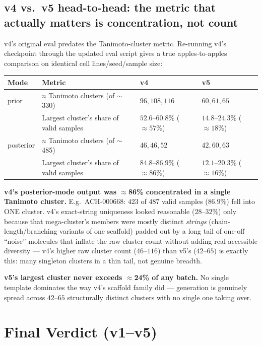 \documentclass[11pt]{article}
\begin{document}
\subsection{v4 vs.\ v5 head-to-head: the metric that actually matters is concentration, not count}
\label{sec:headtohead}

v4's original eval predates the Tanimoto-cluster metric. Re-running v4's checkpoint through the updated eval script gives a true apples-to-apples comparison on identical cell lines/seed/sample size:

\begin{center}
\begin{tabular}{@{}l l l l@{}}
\toprule
\textbf{Mode} & \textbf{Metric} & \textbf{v4} & \textbf{v5} \\
\midrule
prior & $n$ Tanimoto clusters (of $\sim$330) & $96, 108, 116$ & $60, 61, 65$ \\
      & Largest cluster's share of valid samples & $52.6$--$60.8\%$ ($\approx57\%$) & $14.8$--$24.3\%$ ($\approx18\%$) \\
posterior & $n$ Tanimoto clusters (of $\sim$485) & $46, 46, 52$ & $42, 60, 63$ \\
      & Largest cluster's share of valid samples & $84.8$--$86.9\%$ ($\approx86\%$) & $12.1$--$20.3\%$ ($\approx16\%$) \\
\bottomrule
\end{tabular}
\end{center}

\textbf{v4's posterior-mode output was $\approx$86\% concentrated in a single Tanimoto cluster.} E.g.\ ACH-000668: $423$ of $487$ valid samples ($86.9\%$) fell into ONE cluster. v4's exact-string uniqueness looked reasonable ($28$--$32\%$) only because that mega-cluster's members were mostly distinct \emph{strings} (chain-length/branching variants of one scaffold) padded out by a long tail of one-off ``noise'' molecules that inflate the raw cluster count without adding real accessible diversity --- v4's higher raw cluster count ($46$--$116$) than v5's ($42$--$65$) is exactly this: many singleton clusters in a thin tail, not genuine breadth.

\textbf{v5's largest cluster never exceeds $\approx$24\% of any batch.} No single template dominates the way v4's scaffold family did --- generation is genuinely spread across $42$--$65$ structurally distinct clusters with no single one taking over.

\section{Final Verdict (v1--v5)}
\end{document}
